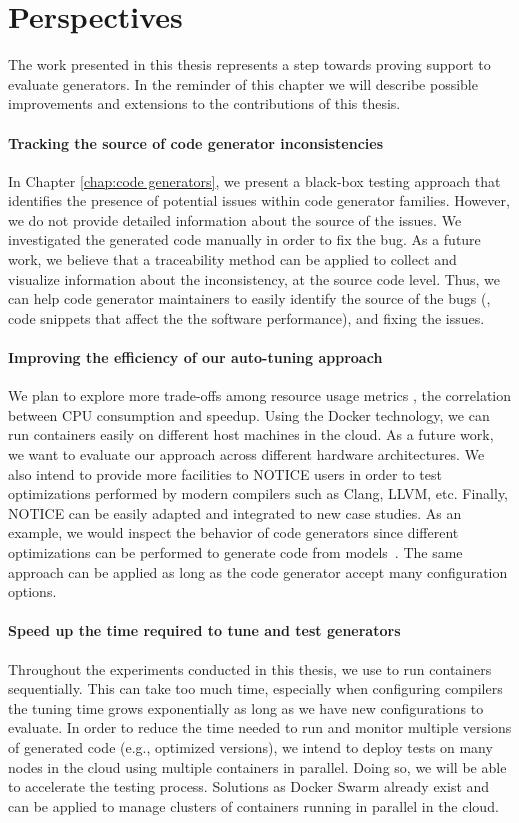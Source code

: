 \section{Perspectives}
The work presented in this thesis represents a step towards proving support to evaluate generators. In the reminder of this chapter we will describe possible improvements and extensions to the contributions of this thesis.

\paragraph{Tracking the source of code generator inconsistencies} 
In Chapter \ref{chap:code generators}, we present a black-box testing approach that identifies the presence of potential issues within code generator families. However, we do not provide detailed information about the source of the issues. We investigated the generated code manually in order to fix the bug. As a future work, we believe that a traceability method can be applied to collect and visualize information about the inconsistency, at the source code level. Thus, we can help code generator maintainers to easily identify the source of the bugs (\eg, code snippets that affect the the software performance), and fixing the issues.

\paragraph{Improving the efficiency of our auto-tuning approach}
We plan to explore more trade-offs among resource usage metrics \eg, the correlation between CPU consumption and speedup. Using the Docker technology, we can run containers easily on different host machines in the cloud. As a future work, we want to evaluate our approach across different hardware architectures.
We also intend to provide more facilities to NOTICE users in order to test optimizations performed by modern compilers such as Clang, LLVM, etc.
Finally, NOTICE can be easily adapted and integrated to new case studies. As an example, we would inspect the behavior of code generators since different optimizations can be performed to generate code from models~\cite{stuermer2007systematic}. The same approach can be applied as long as the code generator accept many configuration options.

\paragraph{Speed up the time required to tune and test generators}
Throughout the experiments conducted in this thesis, we use to run containers sequentially. This can take too much time, especially when configuring compilers the tuning time grows exponentially as long as we have new configurations to evaluate. 
In order to reduce the time needed to run and monitor multiple versions of generated code (e.g., optimized versions), we intend to deploy tests on many nodes in the cloud using multiple containers in parallel. Doing so, we will be able to accelerate the testing process. Solutions as Docker Swarm already exist and can be applied to manage clusters of containers running in parallel in the cloud.

